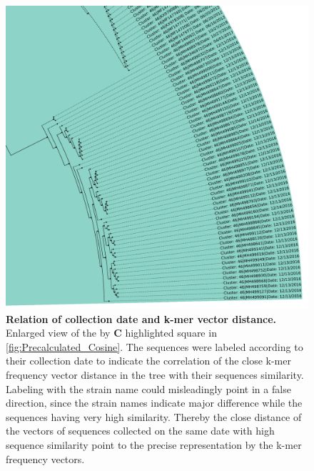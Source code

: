 \begin{figure}[!hbt]
    \centering
    \includegraphics[width=\textwidth]{Graphics/identical.pdf}
    \caption[Relation of collection date and k-mer vector distance]{\textbf{Relation of collection date and k-mer vector distance.} Enlarged view of the by \textbf{\textsf{C}} highlighted square in \autoref{fig:Precalculated_Cosine}. The sequences were labeled according to their collection date to indicate the correlation of the close k-mer frequency vector distance in the tree with their sequences similarity. Labeling with the strain name could misleadingly point in a false direction, since the strain names indicate major difference while the sequences having very high similarity. Thereby the close distance of the vectors of sequences collected on the same date with high sequence similarity point to the precise representation by the k-mer frequency vectors.}
    \label{fig:focus}
\end{figure}

